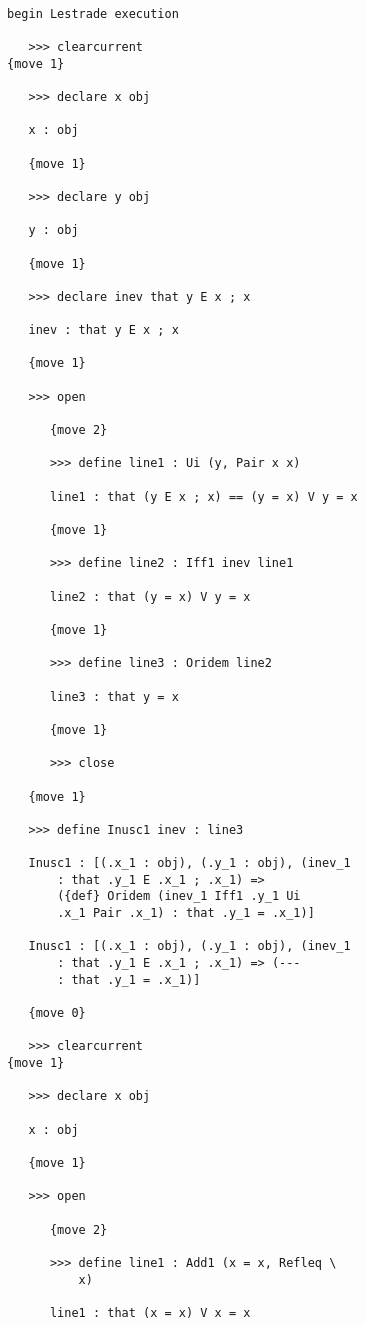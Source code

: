 \documentclass[12pt]{article}
\begin{document}
\begin{verbatim}

begin Lestrade execution

   >>> clearcurrent
{move 1}

   >>> declare x obj

   x : obj

   {move 1}

   >>> declare y obj

   y : obj

   {move 1}

   >>> declare inev that y E x ; x

   inev : that y E x ; x

   {move 1}

   >>> open

      {move 2}

      >>> define line1 : Ui (y, Pair x x)

      line1 : that (y E x ; x) == (y = x) V y = x

      {move 1}

      >>> define line2 : Iff1 inev line1

      line2 : that (y = x) V y = x

      {move 1}

      >>> define line3 : Oridem line2

      line3 : that y = x

      {move 1}

      >>> close

   {move 1}

   >>> define Inusc1 inev : line3

   Inusc1 : [(.x_1 : obj), (.y_1 : obj), (inev_1 
       : that .y_1 E .x_1 ; .x_1) => 
       ({def} Oridem (inev_1 Iff1 .y_1 Ui 
       .x_1 Pair .x_1) : that .y_1 = .x_1)]

   Inusc1 : [(.x_1 : obj), (.y_1 : obj), (inev_1 
       : that .y_1 E .x_1 ; .x_1) => (--- 
       : that .y_1 = .x_1)]

   {move 0}

   >>> clearcurrent
{move 1}

   >>> declare x obj

   x : obj

   {move 1}

   >>> open

      {move 2}

      >>> define line1 : Add1 (x = x, Refleq \
          x)

      line1 : that (x = x) V x = x


\end{verbatim}
\end{document}
